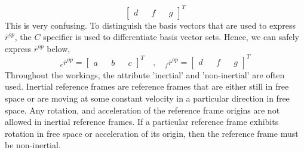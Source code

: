 \documentclass[class=report, 12pt, crop=false]{standalone}
\begin{document}
\begin{center}
$$\begin{bmatrix}
d && f && g
\end{bmatrix}^{T}$$
This is very confusing. To distinguish the basis vectors that are used to express $\bar{r}^{op}$, the $C$ specifier is used to differentiate basis vector sets. Hence, we can safely express $\bar{r}^{op}$ below,
$${}^{}_{e}\bar{r}^{op} = \begin{bmatrix}
a && b && c
\end{bmatrix}^{T} \quad,\quad {}^{}_{f}\bar{r}^{op} = \begin{bmatrix}
d && f && g
\end{bmatrix}^{T}$$
Throughout the workings, the attribute 'inertial' and 'non-inertial' are often used. Inertial reference frames are reference frames that are either still in free space or are moving at some constant velocity in a particular direction in free space. Any rotation, and acceleration of the reference frame origins are not allowed in inertial reference frames. If a particular reference frame exhibits rotation in free space or acceleration of its origin, then the reference frame must be non-inertial.

\end{center}
\end{document}
